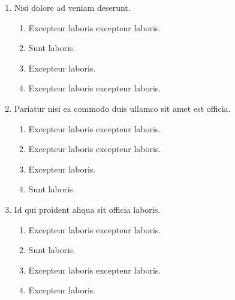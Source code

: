 \documentclass[a4paper,12pt]{article}
\begin{document}
\begin{enumerate}[label=\textbf{\arabic*.}]
\begin{multicols}{2}
\begin{enumerate}
	\end{enumerate}

\end{multicols}
\item Nisi dolore ad veniam deserunt.
\begin{multicols}{2}
	\begin{enumerate}
		\item  Excepteur laboris excepteur laboris.
  
		\item  Sunt laboris.
    
		\item  Excepteur laboris.
    
		\item  Excepteur laboris excepteur laboris.
    
	\end{enumerate}

\end{multicols}
\item Pariatur nisi ea commodo duis ullamco sit amet est officia.
\begin{multicols}{2}
	\begin{enumerate}
		\item  Excepteur laboris excepteur laboris.
    
		\item  Excepteur laboris excepteur laboris.
  
		\item  Excepteur laboris.
    
		\item  Sunt laboris.
    
	\end{enumerate}

\end{multicols}
\item Id qui proident aliqua sit officia laboris.
\begin{multicols}{2}
	\begin{enumerate}
		\item  Excepteur laboris excepteur laboris.
    
		\item  Sunt laboris.
    
		\item  Excepteur laboris excepteur laboris.
  
		\item  Excepteur laboris.
    
	\end{enumerate}


\end{multicols}
\end{enumerate}
\end{document}
